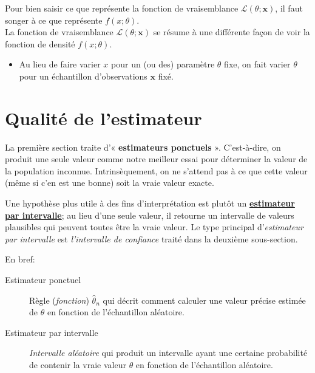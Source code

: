 \documentclass[french]{article}
\begin{document}
\begin{multicols*}{2}
Pour bien saisir ce que représente la fonction de vraisemblance $\mathcal{L}(\theta; \bm{x})$, il faut songer à ce que représente $f(x; \theta)$. \\
La fonction de vraisemblance $\mathcal{L}(\theta; \bm{x})$ se résume à une différente façon de voir la fonction de densité $f(x ; \theta)$. 
\begin{itemize}
	\item	Au lieu de faire varier $x$ pour un (ou des) paramètre $\theta$ fixe, on fait varier $\theta$ pour un échantillon d'observations $\bm{x}$ fixé.
\end{itemize}




\columnbreak
\section{Qualité de l'estimateur}\label{sec:EsimatorQuality}
La première section traite d'« \textbf{estimateurs ponctuels} ». 
C'est-à-dire, on produit une seule valeur comme notre meilleur essai pour déterminer la valeur de la population inconnue.
Intrinsèquement, on ne s'attend pas à ce que cette valeur (même si c'en est une bonne) soit la vraie valeur exacte.

\bigskip

Une hypothèse plus utile à des fins d'interprétation est plutôt un \textbf{\hyperref[sec:int-estimation]{estimateur par intervalle}}; au lieu d'une seule valeur, il retourne un intervalle de valeurs plausibles qui peuvent toutes être la vraie valeur. 
Le type principal d'\textit{estimateur par intervalle} est \textit{l'intervalle de confiance} traité dans la deuxième sous-section.

\bigskip

En bref:
\begin{description}
	\item[Estimateur ponctuel]	Règle (\textit{fonction}) $\hat{\theta}_{n}$ qui décrit comment calculer une valeur précise estimée de $\theta$ en fonction de l'échantillon aléatoire. 
	\item[Estimateur par intervalle]	\textit{Intervalle aléatoire} qui produit un intervalle ayant une certaine probabilité de contenir la vraie valeur $\theta$ en fonction de l'échantillon aléatoire.
\end{description}




\end{multicols*}
\end{document}

